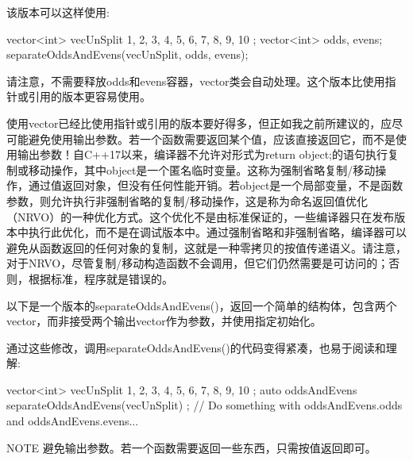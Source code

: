 该版本可以这样使用:

\begin{cpp}
vector<int> vecUnSplit { 1, 2, 3, 4, 5, 6, 7, 8, 9, 10 };
vector<int> odds, evens;
separateOddsAndEvens(vecUnSplit, odds, evens);
\end{cpp}

请注意，不需要释放odds和evens容器，vector类会自动处理。这个版本比使用指针或引用的版本更容易使用。

使用vector已经比使用指针或引用的版本要好得多，但正如我之前所建议的，应尽可能避免使用输出参数。若一个函数需要返回某个值，应该直接返回它，而不是使用输出参数！自C++17以来，编译器不允许对形式为return object;的语句执行复制或移动操作，其中object是一个匿名临时变量。这称为强制省略复制/移动操作，通过值返回对象，但没有任何性能开销。若object是一个局部变量，不是函数参数，则允许执行非强制省略的复制/移动操作，这是称为命名返回值优化（NRVO）的一种优化方式。这个优化不是由标准保证的，一些编译器只在发布版本中执行此优化，而不是在调试版本中。通过强制省略和非强制省略，编译器可以避免从函数返回的任何对象的复制，这就是一种零拷贝的按值传递语义。请注意，对于NRVO，尽管复制/移动构造函数不会调用，但它们仍然需要是可访问的；否则，根据标准，程序就是错误的。

以下是一个版本的separateOddsAndEvens()，返回一个简单的结构体，包含两个vector，而非接受两个输出vector作为参数，并使用指定初始化。


通过这些修改，调用separateOddsAndEvens()的代码变得紧凑，也易于阅读和理解:

\begin{cpp}
vector<int> vecUnSplit { 1, 2, 3, 4, 5, 6, 7, 8, 9, 10 };
auto oddsAndEvens { separateOddsAndEvens(vecUnSplit) };
// Do something with oddsAndEvens.odds and oddsAndEvens.evens...
\end{cpp}

\begin{myNotic}{NOTE}
避免输出参数。若一个函数需要返回一些东西，只需按值返回即可。
\end{myNotic}

